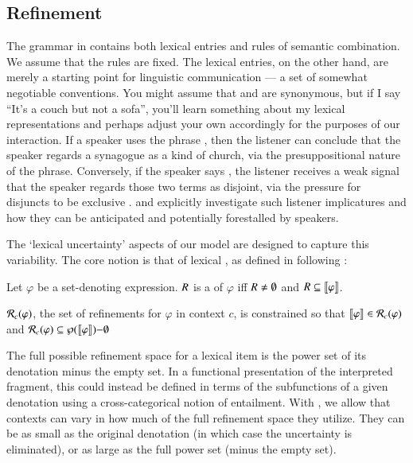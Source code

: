\documentclass[leqno,12pt]{article}
\begin{document}

\subsection{Refinement}\label{sec:refine}

The grammar in  contains both lexical entries and
rules of semantic combination. We assume that the rules are fixed.
The lexical entries, on the other hand, are merely a starting point
for linguistic communication --- a set of somewhat negotiable
conventions. You might assume that  and  are
synonymous, but if I say ``It's a couch but not a sofa'', you'll learn
something about my lexical representations and perhaps adjust your own
accordingly for the purposes of our interaction.  If a speaker uses
the phrase , then the listener can
conclude that the speaker regards a synagogue as a kind of church, via
the presuppositional nature of the phrase. Conversely, if the speaker
says , the listener receives a weak signal
that the speaker regards those two terms as disjoint, via the pressure
for disjuncts to be exclusive
\citep{Hurford:1974}. \citet{Chemla-HurfordCounts} and
\citet{Potts:Levy:2015} explicitly investigate such listener
implicatures and how they can be anticipated and potentially
forestalled by speakers.

The `lexical uncertainty' aspects of our model are designed to capture
this variability. The core notion is that of lexical
, as defined in  following \citet{Bergen:Levy:Goodman:2014}:

\begin{examples}
\item\label{refinement} 
  \begin{examples}
  \item Let $\varphi$ be a set-denoting expression. $R$ is a
     of $\varphi$ iff $R \neq \emptyset$ and
    $R \subseteq \llbracket\varphi\rrbracket$.
  \item\label{refine} $\mathcal{R}_{c}(\varphi)$, the set of refinements for
    $\varphi$ in context $c$, is constrained so that
    $\llbracket\varphi\rrbracket \in \mathcal{R}_{c}(\varphi)$ and
    $\mathcal{R}_{c}(\varphi) \subseteq \wp(\llbracket\varphi\rrbracket){-}\emptyset$
  \end{examples}
\end{examples}
%
The full possible refinement space for a lexical item is the power set
of its denotation minus the empty set. In a functional presentation of
the interpreted fragment, this could instead be defined in terms of
the subfunctions of a given denotation using a cross-categorical
notion of entailment. With , we allow that
contexts can vary in how much of the full refinement space they
utilize. They can be as small as the original denotation (in which
case the uncertainty is eliminated), or as large as the full power set
(minus the empty set).
\end{document}
